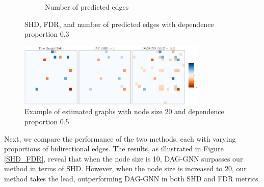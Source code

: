 \documentclass[10pt]{article}
\begin{document}
\begin{figure}
\begin{subfigure}{0.45\textwidth}
        \caption{Number of predicted edges}
        \label{pred_edge_prop30}
    \end{subfigure}
    \caption{SHD, FDR, and number of predicted edges with dependence proportion 0.3}
    \label{SHD_FDR_prop30}
\end{figure}

\begin{figure}[H]
    \centering
    \includegraphics[width=0.8\textwidth]{fig/comparison_dep_20_50_seed31.pdf}
    \caption{Example of estimated graphs with node size 20 and dependence proportion 0.5}
    \label{example_graphs}
\end{figure}

Next, we compare the performance of the two methods, each with varying proportions of bidirectional edges. The results, as illustrated in Figure \ref*{SHD_FDR}, reveal that when the node size is 10, DAG-GNN surpasses our method in terms of SHD. However, when the node size is increased to 20, our method takes the lead, outperforming DAG-GNN in both SHD and FDR metrics.
\end{document}
